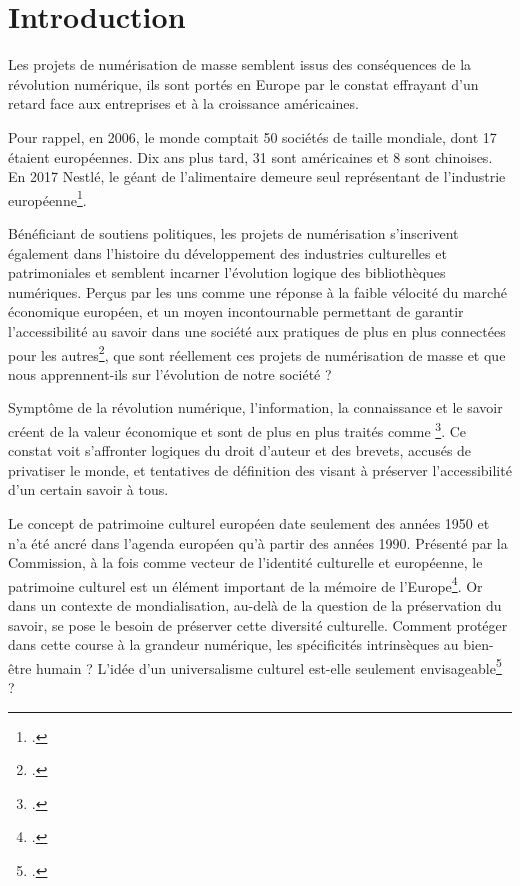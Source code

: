 \part*{Introduction}

Les projets de numérisation de masse semblent issus des conséquences de la révolution numérique, ils sont portés en Europe par le constat effrayant d'un retard face aux entreprises et à la croissance américaines.

Pour rappel, en 2006, le monde comptait 50 sociétés de taille mondiale, dont 17 étaient européennes. Dix ans plus tard, 31 sont américaines et 8 sont chinoises. En 2017 Nestlé, le géant de l'alimentaire demeure seul représentant de l'industrie européenne\footcite{battu_histoire_2018}. 

Bénéficiant de soutiens politiques, les projets de numérisation s'inscrivent également dans l'histoire du développement des industries culturelles et patrimoniales et semblent incarner l'évolution logique des bibliothèques numériques. Perçus par les uns comme une réponse à la faible vélocité du marché économique européen, et un moyen incontournable permettant de garantir l'accessibilité au savoir dans une société aux pratiques de plus en plus connectées pour les autres\footcite{wu_building_2011}, que sont réellement ces projets de numérisation de masse et que nous apprennent-ils sur l'évolution de notre société ? 

Symptôme de la révolution numérique, l'information, la connaissance et le savoir créent de la valeur économique et sont de plus en plus traités comme \footcite[p.105]{mattelart_histoire_2018}. Ce constat voit s'affronter logiques du droit d'auteur et des brevets, accusés de privatiser le monde, et tentatives de définition des  visant à préserver l'accessibilité d'un certain savoir à tous. 

Le concept de patrimoine culturel européen date seulement des années 1950 et n'a été ancré dans l'agenda européen qu'à partir des années 1990. Présenté par la Commission, à la fois comme vecteur de l'identité culturelle et européenne, le patrimoine culturel est un élément important de la mémoire de l'Europe\footcite{thelle_persuasive_2011}. Or dans un contexte de mondialisation, au-delà de la question de la préservation du savoir, se pose le besoin de préserver cette diversité culturelle. Comment protéger dans cette course à la grandeur numérique, les spécificités intrinsèques au bien-être humain ? L'idée d'un universalisme culturel est-elle seulement envisageable\footcite{laulan_diversite_2018} ?

